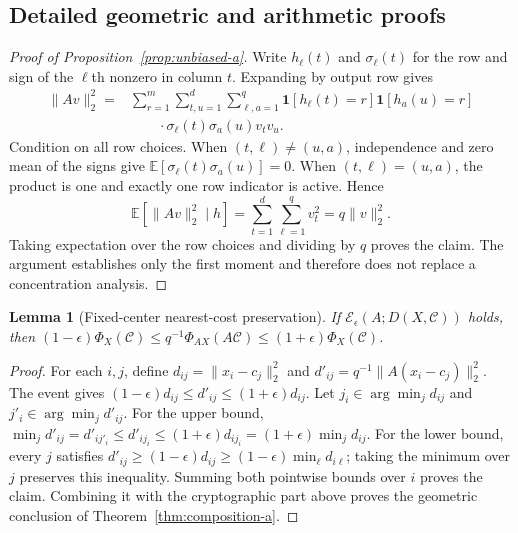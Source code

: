 \documentclass[pdflatex,sn-mathphys-num,iicol]{sn-jnl}
\theoremstyle{plain}
\newtheorem{lemma}[theorem]{Lemma}
\theoremstyle{definition}
\theoremstyle{remark}
\begin{document}
\begin{appendices}
\section{Detailed geometric and arithmetic proofs}\label{app:geometry-a}
\begin{proof}[Proof of Proposition~\ref{prop:unbiased-a}]
Write $h_\ell(t)$ and $\sigma_\ell(t)$ for the row and sign of the $\ell$th nonzero in column $t$. Expanding by output row gives
\begin{align*}
\|Av\|_2^2
={}&\sum_{r=1}^{m}\sum_{t,u=1}^{d}\sum_{\ell,a=1}^{q}
\mathbf 1[h_\ell(t)=r]\mathbf 1[h_a(u)=r]\\
&\qquad{}\cdot\sigma_\ell(t)\sigma_a(u)v_tv_u.
\end{align*}
Condition on all row choices. When $(t,\ell)\ne(u,a)$, independence and zero mean of the signs give
$\mathbb E[\sigma_\ell(t)\sigma_a(u)]=0$. When $(t,\ell)=(u,a)$, the product is one and exactly one row indicator is active. Hence
\[
\mathbb E[\|Av\|_2^2\mid h]
=\sum_{t=1}^{d}\sum_{\ell=1}^{q}v_t^2
=q\|v\|_2^2.
\]
Taking expectation over the row choices and dividing by $q$ proves the claim. The argument establishes only the first moment and therefore does not replace a concentration analysis.
\end{proof}

\begin{lemma}[Fixed-center nearest-cost preservation]\label{lem:fixed-cost-a}
If $\mathcal E_\epsilon(A;D(X,\mathcal C))$ holds, then
$(1-\epsilon)\Phi_X(\mathcal C)\le q^{-1}\Phi_{AX}(A\mathcal C)\le(1+\epsilon)\Phi_X(\mathcal C)$.
\end{lemma}
\begin{proof}
For each $i,j$, define $d_{ij}=\|x_i-c_j\|_2^2$ and $d'_{ij}=q^{-1}\|A(x_i-c_j)\|_2^2$. The event gives $(1-\epsilon)d_{ij}\le d'_{ij}\le(1+\epsilon)d_{ij}$. Let $j_i\in\arg\min_jd_{ij}$ and $j'_i\in\arg\min_jd'_{ij}$. For the upper bound,
$\min_jd'_{ij}=d'_{ij'_i}\le d'_{ij_i}\le(1+\epsilon)d_{ij_i}=(1+\epsilon)\min_jd_{ij}$.
For the lower bound, every $j$ satisfies $d'_{ij}\ge(1-\epsilon)d_{ij}\ge(1-\epsilon)\min_\ell d_{i\ell}$; taking the minimum over $j$ preserves this inequality. Summing both pointwise bounds over $i$ proves the claim. Combining it with the cryptographic part above proves the geometric conclusion of Theorem~\ref{thm:composition-a}.
\end{proof}


\end{appendices}
\end{document}

